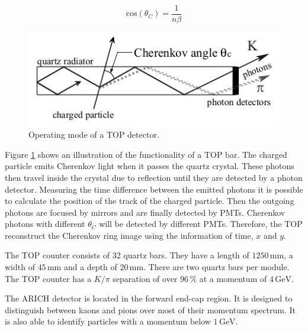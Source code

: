 \documentclass[a4paper,11pt,twosided,final,german,openbib,pdftex,listof=totoc,bibliography=totoc]{scrbook}
\begin{document}
\begin{equation}
\textrm{cos}(\theta_C)=\frac{1}{n\beta}
\end{equation}

\begin{figure}[h!]
	\centering
	\includegraphics[width=12cm]{Bilder/TOP}
	\caption[TOP Principle]{Operating mode of a TOP detector.\cite{B2TR}}
	\label{fig:TOP}
\end{figure}

Figure \ref{fig:TOP} shows an illustration of the functionality of a TOP bar. The charged particle emits Cherenkov light when it passes the quartz crystal. These photons then travel inside the crystal due to reflection until they are detected by a photon detector. Measuring the time difference between the emitted photons it is possible to calculate the position of the track of the charged particle. Then the outgoing photons are focused by mirrors and are finally detected by PMTs. Cherenkov photons with different $\theta_C$ will be detected by different PMTs. Therefore, the TOP reconstruct the Cherenkov ring image using the information of time, $x$ and $y$.\cite{B2TR} 

The TOP counter consists of 32 quartz bars. They have a length of $1250\,\textrm{mm}$, a width of $45\,\textrm{mm}$ and a depth of $20\,\textrm{mm}$. There are two quartz bars per module. The TOP counter has a $K/\pi$ separation of over $96\,\%$ at a momentum of $4\,\textrm{GeV}$.\cite{B2TR}

The ARICH detector is located in the forward end-cap region. It is designed to distinguish between kaons and pions over most of their momentum spectrum. It is also able to identify particles with a momentum below $1\,\textrm{GeV}$.
\end{document}
